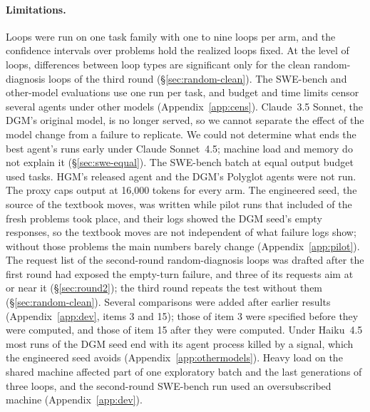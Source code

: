 \paragraph{Limitations.} Loops were run on one task family with one to nine loops per arm, and the confidence intervals
over problems hold the realized loops fixed. At the level of loops, differences between loop types are significant only
for the clean random-diagnosis loops of the third round (\S\ref{sec:random-clean}). The SWE-bench and other-model evaluations use one run per task, and budget and time limits censor several
agents under other models (Appendix~\ref{app:cens}). Claude~3.5 Sonnet, the DGM's original model, is no longer served,
so we cannot separate the effect of the model change from a failure to replicate. We could not determine what ends the
best agent's runs early under Claude Sonnet~4.5; machine load and memory do not explain it (\S\ref{sec:swe-equal}). The SWE-bench batch at equal output budget used \wN{} tasks. HGM's released agent and the DGM's Polyglot agents were not run. The proxy caps output at 16{,}000 tokens for
every arm. The engineered seed, the source of the textbook moves, was written while pilot runs that included \vnpN{}
of the fresh problems took place, and their logs showed the DGM seed's empty responses, so the textbook moves are not
independent of what failure logs show; without those problems the main numbers barely change (Appendix~\ref{app:pilot}).
The request list of the second-round random-diagnosis loops was drafted after the first round had exposed the
empty-turn failure, and three of its requests aim at or near it (\S\ref{sec:round2}); the third round repeats the test
without them (\S\ref{sec:random-clean}). Several
comparisons were added after earlier results (Appendix~\ref{app:dev}, items 3 and 15); those of item 3 were specified
before they were computed, and those of item 15 after they were computed. Under Haiku~4.5 most runs of the DGM seed end with its agent process killed by a signal, which the engineered
seed avoids (Appendix~\ref{app:othermodels}). Heavy load on the shared machine affected part of one exploratory batch
and the last generations of three loops, and the second-round SWE-bench run used an oversubscribed machine
(Appendix~\ref{app:dev}).
